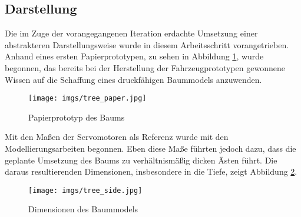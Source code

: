 \documentclass[.../Dokumentation.tex]{subfiles}
\begin{document}
\subsection{Darstellung}\label{sec-ita2-visualization}
Die im Zuge der vorangegangenen Iteration erdachte Umsetzung einer abstrakteren 
Darstellungsweise wurde in diesem Arbeitsschritt vorangetrieben.\\
Anhand eines ersten Papierprototypen, zu sehen in Abbildung 
\ref{fig-tree-paper}, wurde begonnen, das bereits bei der Herstellung der 
Fahrzeugprototypen gewonnene Wissen auf die Schaffung eines druckfähigen 
Baummodels anzuwenden.
\begin{figure}[H]
\begin{center}
    \texttt{[image: imgs/tree\_paper.jpg]}
    \caption{Papierprototyp des Baums}
    \label{fig-tree-paper}
\end{center}
\end{figure}
\noindent
Mit den Maßen der Servomotoren als Referenz wurde mit den Modellierungsarbeiten 
begonnen. Eben diese Maße führten jedoch dazu, dass die geplante Umsetzung 
des Baums zu verhältnismäßig dicken Ästen führt. 
Die daraus resultierenden Dimensionen, insbesondere in die Tiefe, zeigt 
Abbildung \ref{fig-tree-side}.
\begin{figure}[H]
\begin{center}
    \texttt{[image: imgs/tree\_side.jpg]}
    \caption{Dimensionen des Baummodels}
    \label{fig-tree-side}
\end{center}
\end{figure}
\end{document}
